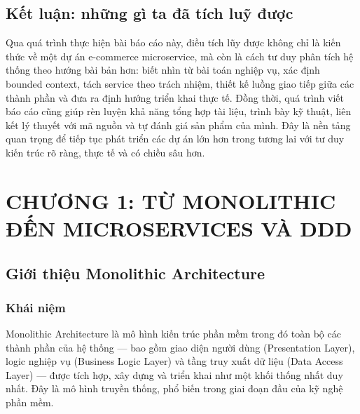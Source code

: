 \documentclass[12pt,a4paper]{article}
\begin{document}
\subsection*{Kết luận: những gì ta đã tích luỹ được}
Qua quá trình thực hiện bài báo cáo này, điều tích lũy được không chỉ là kiến thức về một dự án e-commerce microservice, mà còn là cách tư duy phân tích hệ thống theo hướng bài bản hơn: biết nhìn từ bài toán nghiệp vụ, xác định bounded context, tách service theo trách nhiệm, thiết kế luồng giao tiếp giữa các thành phần và đưa ra định hướng triển khai thực tế. Đồng thời, quá trình viết báo cáo cũng giúp rèn luyện khả năng tổng hợp tài liệu, trình bày kỹ thuật, liên kết lý thuyết với mã nguồn và tự đánh giá sản phẩm của mình. Đây là nền tảng quan trọng để tiếp tục phát triển các dự án lớn hơn trong tương lai với tư duy kiến trúc rõ ràng, thực tế và có chiều sâu hơn.

\begin{abstract}
Báo cáo này trình bày dự án \texttt{e-commerce-microservice} theo hướng từ nền tảng Monolithic, Microservices và DDD đến phân tích, thiết kế, hiện thực và triển khai hệ thống e-commerce hoàn chỉnh. Nội dung bao quát các service nghiệp vụ chính, AI service, cơ chế giao tiếp giữa các thành phần, cấu hình Docker và luồng mua hàng end-to-end. Những phần chưa tách thành service độc lập như Cart, Shipping, JWT hay Nginx được mô tả ở mức logic hiện tại và định hướng mở rộng.
\end{abstract}

\tableofcontents
\newpage

\section{CHƯƠNG 1: TỪ MONOLITHIC ĐẾN MICROSERVICES VÀ DDD}
\subsection{Giới thiệu Monolithic Architecture}
\subsubsection{Khái niệm}
Monolithic Architecture là mô hình kiến trúc phần mềm trong đó toàn bộ các thành phần của hệ
thống --- bao gồm giao diện người dùng (Presentation Layer), logic nghiệp vụ (Business Logic
Layer) và tầng truy xuất dữ liệu (Data Access Layer) --- được tích hợp, xây dựng và triển khai
như một khối thống nhất duy nhất. Đây là mô hình truyền thống, phổ biến trong giai đoạn đầu
của kỹ nghệ phần mềm.
\end{document}
